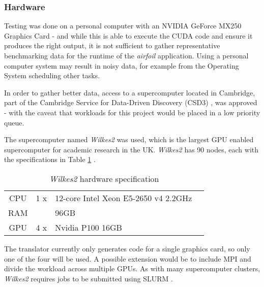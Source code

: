 \subsubsection{Hardware}
Testing was done on a personal computer with an NVIDIA GeForce MX250 Graphics Card \cite{mx250} - and while this is able to execute the CUDA code and ensure it produces the right output, it is not sufficient to gather representative benchmarking data for the runtime of the \textit{airfoil} application. Using a personal computer system may result in noisy data, for example from the Operating System scheduling other tasks.
\par
In order to gather better data, access to a supercomputer located in Cambridge, part of the Cambridge Service for Data-Driven Discovery (CSD3) \cite{csd3}, was approved - with the caveat that workloads for this project would be placed in a low priority queue.
\par
The supercomputer named \textit{Wilkes2} was used, which is the largest GPU enabled supercomputer for academic research in the UK. \textit{Wilkes2} has 90 nodes, each with the specifications in Table \ref{tab:wilkes2} \cite{wilkes2}. \clearpage

\begin{table}[h]
  \centering
  \renewcommand{\arraystretch}{1.5}
  \caption{\textit{Wilkes2} hardware specification}
  \label{tab:wilkes2}
\begin{tabular}{c |r l c}
CPU & 1 x&12-core Intel Xeon E5-2650 v4 2.2GHz & \cite{xeon}\\
RAM & &96GB &\\
GPU & 4 x&Nvidia P100 16GB &\cite{p100}\\
\end{tabular}
\end{table}

The translator currently only generates code for a single graphics card, so only one of the four will be used. A possible extension would be to include MPI and divide the workload across multiple GPUs. As with many supercomputer clusters, \textit{Wilkes2} requires jobs to be submitted using SLURM \cite{slurm}.

